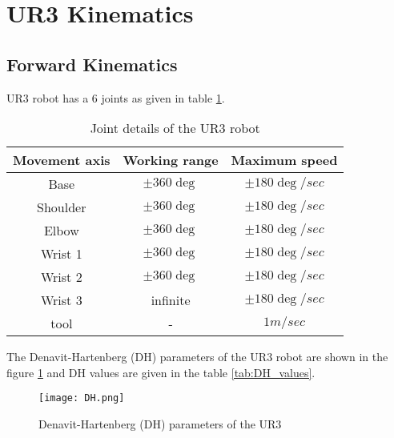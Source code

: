 \section{UR3 Kinematics}

\subsection{Forward Kinematics} 

\noindent UR3 robot has a 6 joints as given in table \ref{tab:UR3_joints}.  

\begin{table}[htbp]
	\begin{center}
		\begin{tabular}{|c|c|c|}
			\hline
			\textbf{Movement axis} & \textbf{Working range} & \textbf{Maximum speed}\\
			\hline
			Base & $\pm 360\deg$ & $\pm 180\deg /sec$\\
			Shoulder & $\pm 360\deg$ & $\pm 180\deg /sec$\\
			Elbow & $\pm 360\deg$ & $\pm 180\deg /sec$ \\
			Wrist 1 & $\pm 360\deg$ & $\pm 180\deg/ sec$\\
			Wrist 2 & $\pm 360\deg$ & $\pm 180\deg /sec$\\
			Wrist 3 & infinite & $\pm 180\deg /sec$\\
			tool & - & $1m/sec$\\
			\hline
		\end{tabular}
		\caption{Joint details of the UR3 robot}
		\label{tab:UR3_joints}
	\end{center}
\end{table}

\noindent The Denavit-Hartenberg (DH) parameters of the UR3 robot are shown in the figure \ref{fig:DH} and DH values are given in the table \ref{tab:DH_values}. 

\begin{figure}[hbt!]
	\centering
	\texttt{[image: DH.png]}
	\caption{Denavit-Hartenberg (DH) parameters of the UR3} 
	\label{fig:DH}
\end{figure} 

